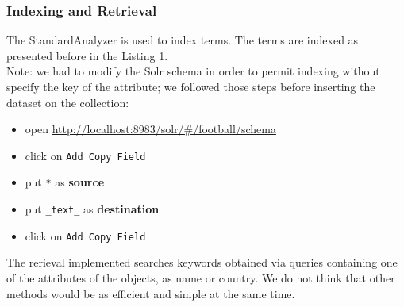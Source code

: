 \documentclass{article}
\begin{document}
\subsubsection{Indexing and Retrieval}
The StandardAnalyzer is used to index terms. The terms are indexed as presented before in the Listing 1.\\
Note: we had to modify the Solr schema in order to permit indexing without specify the key of the attribute; we followed those steps before inserting the dataset on the collection:\\
\begin{itemize}
    \item open \url{http://localhost:8983/solr/#/football/schema}
    \item click on \texttt{Add Copy Field}
    \item put \texttt{*} as \textbf{source}
    \item put \texttt{\_text\_} as \textbf{destination}
    \item click on \texttt{Add Copy Field}
\end{itemize}
The rerieval implemented searches keywords obtained via queries containing one of the attributes of the objects, as name or country. We do not think that other methods would be as efficient and simple at the same time.
\end{document}
